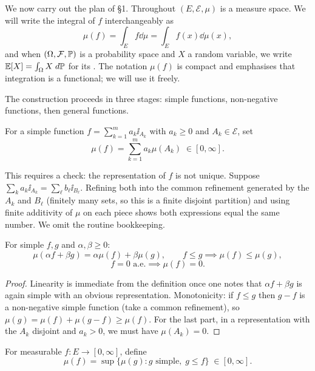 \documentclass[a4paper]{scrartcl}
\newcommand{\cE}{\mathcal{E}}
\newcommand{\cF}{\mathcal{F}}
\newcommand{\ind}{\ii}
\begin{document}
We now carry out the plan of \S1. Throughout $(E,\cE,\mu)$ is a measure space. We will write the integral of $f$ interchangeably as
$$
\mu(f) = \int_E f \dd\mu = \int_E f(x) \dd\mu(x),
$$
and when $(\Omega,\cF,\PP)$ is a probability space and $X$ a random variable, we write $\mathbb{E}[X] = \int_\Omega X \; d\mathbb{P}$ for its . The notation $\mu(f)$ is compact and emphasises that integration is a functional; we will use it freely.

The construction proceeds in three stages: simple functions, non-negative functions, then general functions.

\begin{definition}
	For a simple function $f = \sum_{k=1}^m a_k \ind_{A_k}$ with $a_k \geq 0$ and $A_k \in \cE$, set
	$$
	\mu(f) = \sum_{k=1}^m a_k \mu(A_k) \; \in [0,\infty].
	$$
\end{definition}

This requires a check: the representation of $f$ is not unique. Suppose $\sum_k a_k \ind_{A_k} = \sum_\ell b_\ell \ind_{B_\ell}$. Refining both into the common refinement generated by the $A_k$ and $B_\ell$ (finitely many sets, so this is a finite disjoint partition) and using finite additivity of $\mu$ on each piece shows both expressions equal the same number. We omit the routine bookkeeping.

\begin{proposition}\label{prop:int-simple}
	For simple $f,g$ and $\alpha,\beta \geq 0$:
	$$
	\mu(\alpha f + \beta g) = \alpha\mu(f) + \beta\mu(g), \qquad f \leq g \implies \mu(f) \leq \mu(g),
	$$
	$$
	f = 0 \text{ a.e.} \implies \mu(f) = 0.
	$$
\end{proposition}
\begin{proof}
	Linearity is immediate from the definition once one notes that $\alpha f + \beta g$ is again simple with an obvious representation. Monotonicity: if $f \leq g$ then $g - f$ is a non-negative simple function (take a common refinement), so $\mu(g) = \mu(f) + \mu(g-f) \geq \mu(f)$. For the last part, in a representation with the $A_k$ disjoint and $a_k > 0$, we must have $\mu(A_k) = 0$.
\end{proof}

\begin{definition}
	For measurable $f : E \to [0,\infty]$, define
	$$
	\mu(f) = \sup\{ \mu(g) : g \text{ simple}, \; g \leq f \} \; \in [0,\infty].
	$$
\end{definition}
\end{document}
